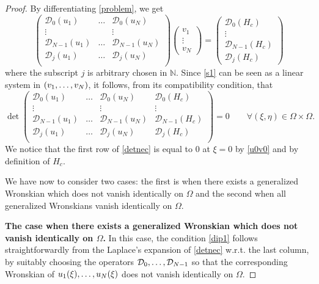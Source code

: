 \documentclass{article}
\newcommand{\N}{\mathds{N}}
\newcommand{\dd}{\mathcal{D}}
\begin{document}
\begin{proof}
By differentiating \eqref{problem}, we get
\begin{equation}\label{s1}
\begin{pmatrix}
\mathcal{D}_0(u_1)&\dots&\mathcal{D}_0(u_N)\\
\vdots & &\vdots\\
\mathcal{D}_{N-1}(u_1)&\dots&\mathcal{D}_{N-1}(u_N)\\
\mathcal{D}_{j}(u_1)&\dots&\mathcal{D}_{j}(u_N)\\
\end{pmatrix}\begin{pmatrix}
 v_1\\
\vdots\\
v_N\end{pmatrix}=\begin{pmatrix}
\mathcal{D}_0(H_c)\\
\vdots\\
\mathcal{D}_{N-1}(H_c)\\
\mathcal{D}_{j}(H_c)
\end{pmatrix}\end{equation}
where the subscript $j$ is arbitrary chosen in $\N$.
Since \eqref{s1} can be seen as a linear system in $(v_1,\mathellipsis,v_N)$, it follows, from its compatibility condition, that
\begin{equation}\label{detnec}
\det\begin{pmatrix}
\mathcal{D}_0(u_1)&\dots&\mathcal{D}_0(u_N) &\mathcal{D}_0(H_c)\\
\vdots & &\vdots&\vdots\\
\mathcal{D}_{N-1}(u_1)&\dots&\mathcal{D}_{N-1}(u_N)&\mathcal{D}_{N-1}(H_c)\\
\dd_j(u_1)&\dots& \dd_j(u_N)&\dd_j(H_c)\\
\end{pmatrix}= 0\qquad \forall (\xi,\eta)\in\Omega\times\Omega.\end{equation}
We notice that the first row of \eqref{detnec} is equal to $0$ at $\xi=0$  by \eqref{u0v0} and by definition of $H_c$.

\smallskip
\noindent
We have now to consider two cases: the first is when there exists a generalized Wronskian which does not vanish identically on $\Omega$ and the second when all generalized Wronskians vanish identically on $\Omega$.

\smallskip
\noindent
\textbf{The case  when there exists a generalized Wronskian which does not vanish identically on $\Omega$.}  In this case, the condition \eqref{dip1} follows straightforwardly from the Laplace's expansion of \eqref{detnec}  w.r.t. the last column, by suitably choosing the operators $\mathcal{D}_0,\mathellipsis,\mathcal{D}_{N-1}$ so that
the corresponding Wronskian of $u_1(\xi),\mathellipsis,u_N(\xi)$
does not vanish identically  on  $\Omega$.



\end{proof}
\end{document}
